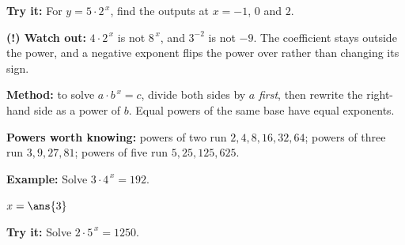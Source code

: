 \documentclass[12pt]{article}
\begin{document}
\begin{tryitbox}
\textbf{Try it:} \quad For $y = 5 \cdot 2^{\,x}$, find the outputs at $x = -1$, $0$ and $2$.\\[2pt]
\end{tryitbox}

\begin{watchoutbox}
\textbf{(!) Watch out:} $4 \cdot 2^{\,x}$ is not $8^{\,x}$, and $3^{-2}$ is not $-9$. The coefficient stays outside the power, and a negative exponent flips the power over rather than changing its sign.
\end{watchoutbox}


\begin{formulabox}
\textbf{Method:} to solve $a \cdot b^{\,x} = c$, divide both sides by $a$ \emph{first}, then rewrite the right-hand side as a power of $b$. Equal powers of the same base have equal exponents.\par
\textbf{Powers worth knowing:} powers of two run $2, 4, 8, 16, 32, 64$; powers of three run $3, 9, 27, 81$; powers of five run $5, 25, 125, 625$.
\end{formulabox}

\begin{examplebox}
\textbf{Example:} \quad Solve $3 \cdot 4^{\,x} = 192$.

$x = \ans{3}$
\end{examplebox}

\begin{tryitbox}
\textbf{Try it:} \quad Solve $2 \cdot 5^{\,x} = 1250$.\\[2pt]
\end{tryitbox}
\end{document}
